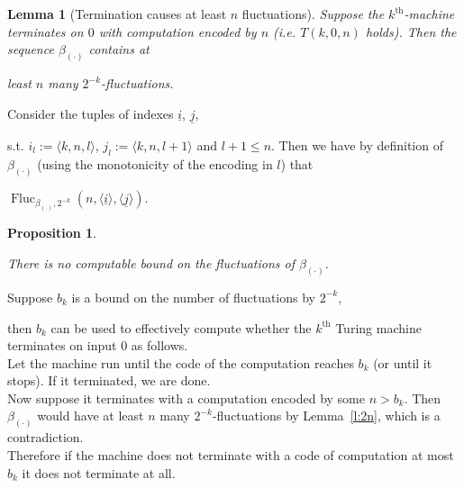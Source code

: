 \documentclass[1p]{elsarticle}
\DeclareMathOperator{\Fluc}{Fluc}
\newcommand{\tup}{\underline} %
\theoremstyle{plain}
\newtheorem{lemma}[thm]{Lemma}
\newtheorem{prop}[thm]{Proposition}
\theoremstyle{definition}
\theoremstyle{remark}
\renewenvironment{proof}[1][]{\noindent{\bf Proof{#1}. }}{\nopagebreak[4]{\hspace*{\fill}


  $\Box$              %

 }{\vspace{2ex}}}
\newcommand{\nbd}{\nobreakdash-}
\theoremstyle{definition}
\begin{document}
{\begin{lemma}[Termination causes at least $n$ fluctuations]
Suppose the $k^\text{th}$-machine terminates on $0$ with computation encoded by $n$ (i.e. $T(k,0,n)$ holds). Then the sequence $\beta_{(\cdot)}$ contains at 

least $n$ many $2^{-k}$\nbd fluctuations.

\end{lemma}

\begin{proof}

Consider the tuples of indexes $\tup i$, $\tup j$, 

s.t. $i_l:=\langle k,n,l\rangle$, $j_l:=\langle k,n,l+1\rangle$ and $l+1\leq n$. Then we have by definition of $\beta_{(\cdot)}$ (using the monotonicity of the encoding in $l$) that

$

\Fluc_{\beta_{(\cdot)},2^{-k}}(n,\langle \tup i \rangle, \langle \tup j\rangle).

$

\end{proof}



\begin{prop}\label{p:alphaHasNoFlucBd}

There is no computable bound on the fluctuations of $\beta_{(\cdot)}$.

\end{prop}

\begin{proof}

Suppose $b_k$ is a bound on the number of fluctuations by $2^{-k}$, 

then $b_k$ can be used to effectively compute whether the $k^{\text{th}}$ Turing machine terminates on input $0$ as follows.\\

Let the machine run until the code of the computation reaches $b_k$ (or until it stops). If it terminated, we are done.\\

Now suppose it terminates with a computation encoded by some $n>b_k$. Then $\beta_{(\cdot)}$ would have at least $n$ many $2^{-k}$\nbd fluctuations by Lemma~\ref{l:2n}, which is a contradiction.\\

Therefore if the machine does not terminate with a code of computation at most $b_k$ it does not terminate at all.

\end{proof}







}
\end{document}
